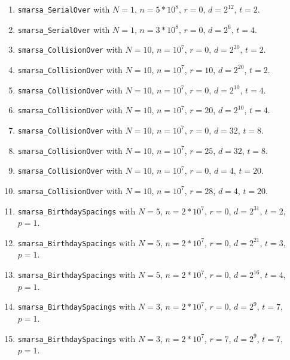   \begin{enumerate}
  \item {\tt smarsa\_SerialOver} with $N=1$,  $n=5*10^8$,  $r=0$,
  $d = 2^{12}$, $t=2$.

  \item {\tt smarsa\_SerialOver} with $N=1$,  $n=3*10^8$,  $r=0$,
  $d = 2^6$, $t=4$.
 
  \item {\tt smarsa\_CollisionOver} with $N=10$,  $n=10^7$,  $r=0$,
  $d = 2^{20}$, $t=2$. 

  \item {\tt smarsa\_CollisionOver} with $N=10$,  $n=10^7$,  $r=10$,
  $d = 2^{20}$,  $t=2$.
 
  \item {\tt smarsa\_CollisionOver} with $N=10$,  $n=10^7$,  $r=0$,
  $d = 2^{10}$, $t=4$. 

  \item {\tt smarsa\_CollisionOver} with $N=10$,  $n=10^7$,  $r=20$,
  $d = 2^{10}$,  $t=4$.

  \item {\tt smarsa\_CollisionOver} with $N=10$,  $n=10^7$,  $r=0$,
  $d = 32$, $t=8$. 

  \item {\tt smarsa\_CollisionOver} with $N=10$,  $n=10^7$,  $r=25$,
  $d = 32$,  $t=8$.

  \item {\tt smarsa\_CollisionOver} with $N=10$,  $n=10^7$,  $r=0$,
  $d = 4$, $t=20$. 

  \item {\tt smarsa\_CollisionOver} with $N=10$,  $n=10^7$,  $r=28$,
  $d = 4$,  $t=20$.

  \item {\tt smarsa\_BirthdaySpacings}  with $N=5$,  $n=2*10^7$, $r=0$,
   $d = 2^{31}$, $t=2$, $p=1$.

  \item {\tt smarsa\_BirthdaySpacings}  with $N=5$,  $n=2*10^7$, $r=0$,
   $d = 2^{21}$, $t=3$, $p=1$.

  \item {\tt smarsa\_BirthdaySpacings}  with $N=5$,  $n=2*10^7$, $r=0$,
   $d = 2^{16}$, $t=4$, $p=1$.

  \item {\tt smarsa\_BirthdaySpacings}  with $N=3$,  $n=2*10^7$, $r=0$,
   $d = 2^{9}$, $t=7$, $p=1$.

  \item {\tt smarsa\_BirthdaySpacings}  with $N=3$,  $n=2*10^7$, $r=7$,
   $d = 2^{9}$, $t=7$, $p=1$.


\end{enumerate}

